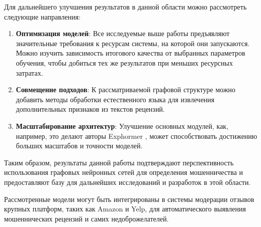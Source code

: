Для дальнейшего улучшения результатов в данной области можно рассмотреть следующие направления:

\begin{enumerate}
    \item \textbf{Оптимизация моделей}: Все исследуемые выше работы предъявляют значительные требования к ресурсам системы, на которой они запускаются. Можно изучить зависимость итогового качества от выбранных параметров обучения, чтобы добиться тех же результатов при меньших ресурсных затратах.

    \item \textbf{Совмещение подходов}: К рассматриваемой графовой структуре можно добавить методы обработки естественного языка для извлечения дополнительных признаков из текстов рецензий.

    \item \textbf{Масштабирование архитектур}: Улучшение основных модулей, как, например, это делают авторы Exphormer \cite{shirzad2023}, может способствовать достижению больших масштабов и точности моделей.
\end{enumerate}

Таким образом, результаты данной работы подтверждают перспективность использования графовых нейронных сетей для определения мошенничества и предоставляют базу для дальнейших исследований и разработок в этой области.

Рассмотренные модели могут быть интегрированы в системы модерации отзывов крупных платформ, таких как Amazon и Yelp, для автоматического выявления мошеннических рецензий и самих недоброжелателей.

\pagebreak

